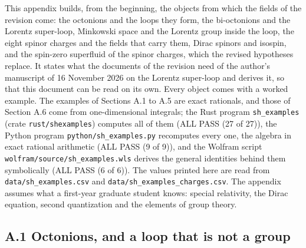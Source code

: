 \documentclass[
  10pt,
]{article}
\begin{document}
This appendix builds, from the beginning, the objects from which the
fields of the revision come: the octonions and the loops they form, the
bi-octonions and the Lorentz super-loop, Minkowski space and the Lorentz
group inside the loop, the eight spinor charges and the fields that
carry them, Dirac spinors and isospin, and the spin-zero superfluid of
the spinor charges, which the revised hypotheses replace. It states what
the documents of the revision need of the author's manuscript of 16
November 2026 on the Lorentz super-loop and derives it, so that this
document can be read on its own. Every object comes with a worked
example. The examples of Sections A.1 to A.5 are exact rationals, and
those of Section A.6 come from one-dimensional integrals; the Rust
program \texttt{sh\_examples} (crate \texttt{rust/shexamples}) computes
all of them (ALL PASS (27 of 27)), the Python program
\texttt{python/sh\_examples.py} recomputes every one, the algebra in
exact rational arithmetic (ALL PASS (9 of 9)), and the Wolfram script
\texttt{wolfram/source/sh\_examples.wls} derives the general identities
behind them symbolically (ALL PASS (6 of 6)). The values printed here
are read from \texttt{data/sh\_examples.csv} and
\texttt{data/sh\_examples\_charges.csv}. The appendix assumes what a
first-year graduate student knows: special relativity, the Dirac
equation, second quantization and the elements of group theory.

\hypertarget{a.1-octonions-and-a-loop-that-is-not-a-group}{%
\subsection{A.1 Octonions, and a loop that is not a
group}\label{a.1-octonions-and-a-loop-that-is-not-a-group}}
\end{document}
